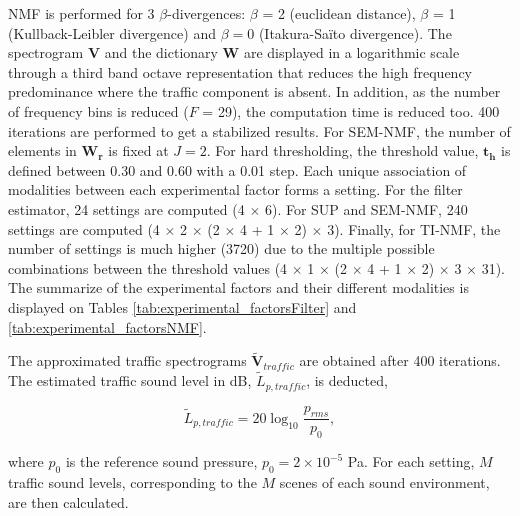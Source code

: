 \documentclass[review,5p,twocolumn,sort&compress,times]{elsarticle}
\begin{document}
NMF is performed for 3 $\beta$-divergences: $\beta$ = 2 (euclidean distance), $\beta$ = 1 (Kullback-Leibler divergence) and $\beta = 0$ (Itakura-Sa\"ito divergence). The spectrogram $\mathbf{V}$ and the dictionary $\mathbf{W}$ are displayed in a logarithmic scale through a third band octave representation that reduces the high frequency predominance where the traffic component is absent. In addition, as the number of frequency bins is reduced ($F$ = 29), the computation time is reduced too. 400 iterations are performed to get a stabilized results. For SEM-NMF, the number of elements in $\mathbf{W_r}$ is fixed at $J = 2$. For hard thresholding, the threshold value, $\mathbf{t_h}$ is defined between 0.30 and 0.60 with a 0.01 step. 
Each unique association of modalities between each experimental factor forms a setting. For the filter estimator, 24 settings are computed (4 $\times$ 6). For SUP and SEM-NMF, 240 settings are computed (4 $\times$ 2 $\times$ (2 $\times$ 4 + 1 $\times$ 2) $\times$ 3). Finally, for TI-NMF, the number of settings is much higher (3720) due to the multiple possible combinations between the threshold values (4 $\times$ 1 $\times$ (2 $\times$ 4 + 1 $\times$ 2) $\times$ 3 $\times$ 31).
The summarize of the experimental factors and their different modalities is displayed on Tables \ref{tab:experimental_factorsFilter} and \ref{tab:experimental_factorsNMF}. 

The approximated traffic spectrograms $\mathbf{\tilde{V}}_{traffic}$ are obtained after 400 iterations. The estimated traffic sound level in dB, $\tilde{L}_{p, traffic}$, is deducted, 

\begin{equation}
\tilde{L}_{p, traffic} = 20\log_{10}\frac{p_{rms}}{p_0}, 
\end{equation}

where $p_0$ is the reference sound pressure, $p_0 = 2\times 10^{-5}$ Pa. For each setting, $M$ traffic sound levels, corresponding to the $M$ scenes of each sound environment, are then calculated. 
\end{document}
